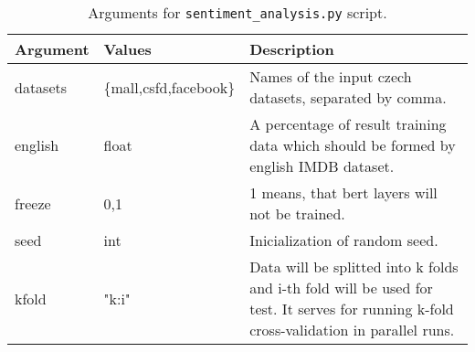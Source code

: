 \begin{table}
\centering
\begin{tabular}{ |p{2cm}|p{}|p{6cm}| } 
 \hline
 Argument & Values & Description \\ 
 \hline \hline
 datasets & \{mall,csfd,facebook\} &  Names of the input czech datasets, separated by comma. \\ \hline
 english & float & A percentage of result training data which should be formed by english IMDB dataset.\\ \hline
 
 freeze & {0,1} & 1 means, that bert layers will not be trained. \\ \hline
 seed & int & Inicialization of random seed. \\ \hline
 kfold & "k:i" & Data will be splitted into k folds and i-th fold will be used for test. It serves for running k-fold cross-validation in parallel runs. \\ \hline
 
 \hline
\end{tabular}
\caption{Arguments for \texttt{sentiment\_analysis.py} script.} 
\label{Tab:sent_args}
\end{table}

